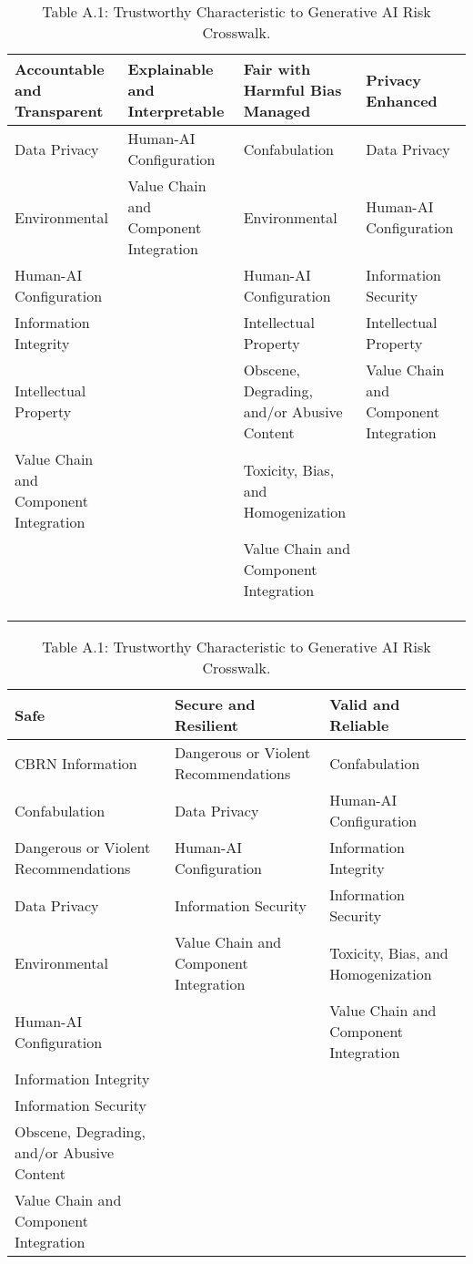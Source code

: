 \documentclass[fleqn]{article}
\begin{document}
\begin{landscape}
\begin{table}[H]
	\caption*{Table A.1: Trustworthy Characteristic to Generative AI Risk Crosswalk.}
	\label{tab:tc_to_gai_risk_cw}
	\footnotesize
	\begin{tabular}{llll}
		\toprule
		\textbf{Accountable and Transparent} & \textbf{Explainable and Interpretable} & \textbf{Fair with Harmful Bias Managed} & \textbf{Privacy Enhanced} \\
		\midrule
		Data Privacy & Human-AI Configuration & Confabulation & Data Privacy \\
		Environmental & Value Chain and Component Integration & Environmental & Human-AI Configuration \\
		Human-AI Configuration &  & Human-AI Configuration & Information Security \\
		Information Integrity &  & Intellectual Property & Intellectual Property \\
		Intellectual Property &  & Obscene, Degrading, and/or Abusive Content & Value Chain and Component Integration \\
		Value Chain and Component Integration &  & Toxicity, Bias, and Homogenization &  \\
 		&  & Value Chain and Component Integration &  \\
 		&  &  &  \\
 		&  &  &  \\
 		&  &  &  \\
		\bottomrule
	\end{tabular}
	\newline
	\vspace{10pt}
	\newline
	\begin{tabular}{lll}
		\toprule
		\textbf{Safe} & \textbf{Secure and Resilient} & \textbf{Valid and Reliable} \\
		\midrule
		CBRN Information & Dangerous or Violent Recommendations & Confabulation \\
		Confabulation & Data Privacy & Human-AI Configuration \\
		Dangerous or Violent Recommendations & Human-AI Configuration & Information Integrity \\
		Data Privacy & Information Security & Information Security \\
		Environmental & Value Chain and Component Integration & Toxicity, Bias, and Homogenization \\
		Human-AI Configuration &  & Value Chain and Component Integration \\
		Information Integrity &  &  \\
		Information Security &  &  \\
		Obscene, Degrading, and/or Abusive Content &  &  \\
		Value Chain and Component Integration &  &  \\
		\bottomrule
	\end{tabular}
\end{table}
\vfill
\raisebox{-10pt}{\makebox[\linewidth]{\thepage}}
\end{landscape}
\end{document}
